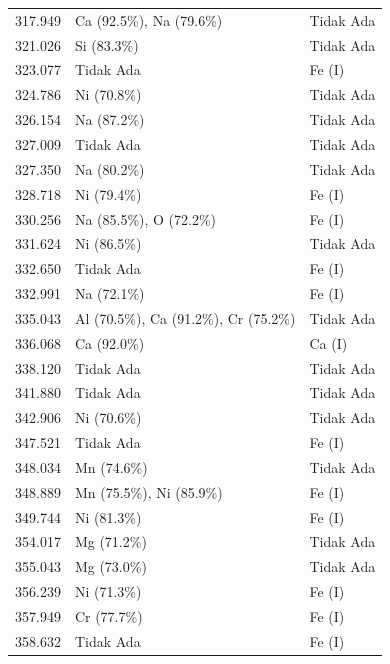 \begin{onehalfspace}
\begin{longtable}{p{} p{} p{}}
    317.949 & Ca (92.5\%), Na (79.6\%) & Tidak Ada \\
    321.026 & Si (83.3\%) & Tidak Ada \\
    323.077 & Tidak Ada & Fe (I) \\
    324.786 & Ni (70.8\%) & Tidak Ada \\
    326.154 & Na (87.2\%) & Tidak Ada \\
    327.009 & Tidak Ada & Tidak Ada \\
    327.350 & Na (80.2\%) & Tidak Ada \\
    328.718 & Ni (79.4\%) & Fe (I) \\
    330.256 & Na (85.5\%), O (72.2\%) & Fe (I) \\
    331.624 & Ni (86.5\%) & Tidak Ada \\
    332.650 & Tidak Ada & Fe (I) \\
    332.991 & Na (72.1\%) & Fe (I) \\
    335.043 & Al (70.5\%), Ca (91.2\%), Cr (75.2\%) & Tidak Ada \\
    336.068 & Ca (92.0\%) & Ca (I) \\
    338.120 & Tidak Ada & Tidak Ada \\
    341.880 & Tidak Ada & Tidak Ada \\
    342.906 & Ni (70.6\%) & Tidak Ada \\
    347.521 & Tidak Ada & Fe (I) \\
    348.034 & Mn (74.6\%) & Tidak Ada \\
    348.889 & Mn (75.5\%), Ni (85.9\%) & Fe (I) \\
    349.744 & Ni (81.3\%) & Fe (I) \\
    354.017 & Mg (71.2\%) & Tidak Ada \\
    355.043 & Mg (73.0\%) & Tidak Ada \\
    356.239 & Ni (71.3\%) & Fe (I) \\
    357.949 & Cr (77.7\%) & Fe (I) \\
    358.632 & Tidak Ada & Fe (I) \\


\end{longtable}
\end{onehalfspace}

